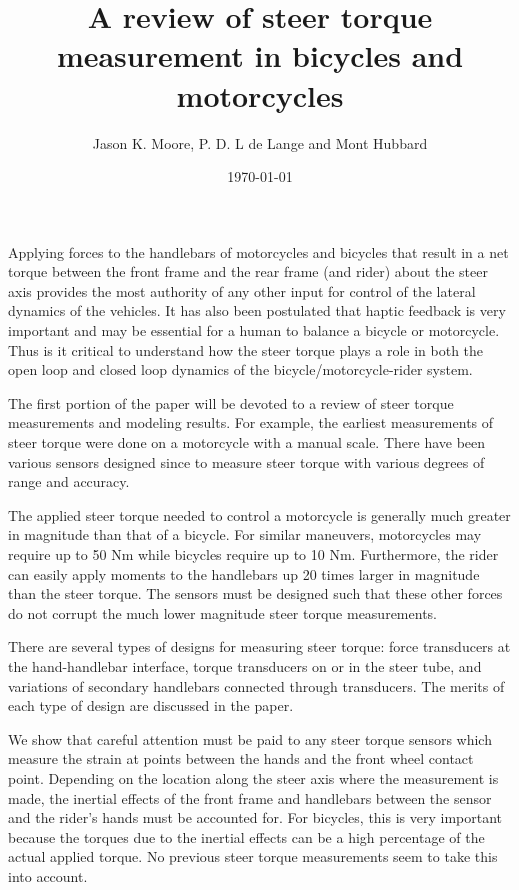 \documentclass{article}
\title{A review of steer torque measurement in bicycles and motorcycles}
\author{Jason K. Moore, P. D. L de Lange and Mont Hubbard}
\date{\today}
\begin{document}
\maketitle

Applying forces to the handlebars of motorcycles and bicycles that result in a
net torque between the front frame and the rear frame (and rider) about the
steer axis provides the most authority of any other input for control of the
lateral dynamics of the vehicles. It has also been postulated that haptic
feedback is very important and may be essential for a human to balance a
bicycle or motorcycle.  Thus is it critical to understand how the steer torque
plays a role in both the open loop and closed loop dynamics of the
bicycle/motorcycle-rider system.

The first portion of the paper will be devoted to a review of steer torque
measurements and modeling results. For example, the earliest measurements of
steer torque were done on a motorcycle \cite{Wilson-Jones1951} with a manual
scale. There have been various sensors designed since to measure steer torque
with various degrees of range and accuracy.

The applied steer torque needed to control a motorcycle is generally much
greater in magnitude than that of a bicycle. For similar maneuvers, motorcycles
may require up to 50 Nm while bicycles require up to 10 Nm. Furthermore, the
rider can easily apply moments to the handlebars up 20 times larger in
magnitude than the steer torque. The sensors must be designed such that these
other forces do not corrupt the much lower magnitude steer torque measurements.

There are several types of designs for measuring steer torque: force
transducers at the hand-handlebar interface, torque transducers on or in the
steer tube, and variations of secondary handlebars connected through
transducers. The merits of each type of design are discussed in the paper.

We show that careful attention must be paid to any steer torque sensors which
measure the strain at points between the hands and the front wheel contact
point.  Depending on the location along the steer axis where the measurement is
made, the inertial effects of the front frame and handlebars between the sensor
and the rider's hands must be accounted for. For bicycles, this is very
important because the torques due to the inertial effects can be a high
percentage of the actual applied torque. No previous steer torque measurements
seem to take this into account.
\end{document}
